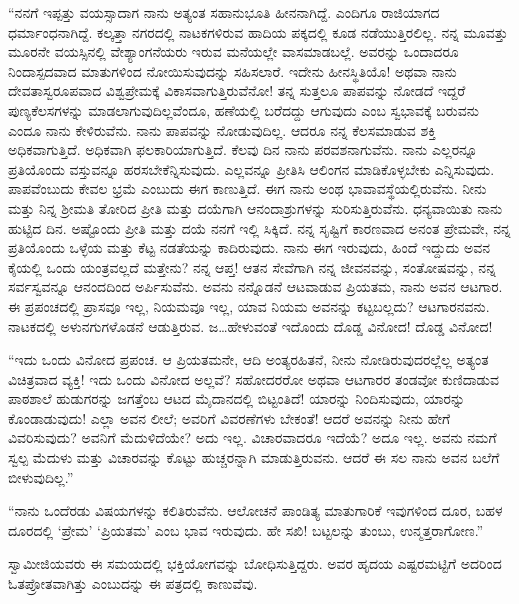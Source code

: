  “ನನಗೆ ಇಪ್ಪತ್ತು ವಯಸ್ಸಾದಾಗ ನಾನು ಅತ್ಯಂತ ಸಹಾನುಭೂತಿ ಹೀನನಾಗಿದ್ದೆ. ಎಂದಿಗೂ ರಾಜಿಯಾಗದ ಧರ್ಮಾಂಧನಾಗಿದ್ದೆ. ಕಲ್ಕತ್ತಾ ನಗರದಲ್ಲಿ ನಾಟಕಗಳಿರುವ ಹಾದಿಯ ಪಕ್ಕದಲ್ಲಿ ಕೂಡ ನಡೆಯುತ್ತಿರಲಿಲ್ಲ. ನನ್ನ ಮೂವತ್ತು ಮೂರನೇ ವಯಸ್ಸಿನಲ್ಲಿ ವೇಶ್ಯಾಂಗನೆಯರು ಇರುವ ಮನೆಯಲ್ಲೇ ವಾಸಮಾಡಬಲ್ಲೆ. ಅವರನ್ನು ಒಂದಾದರೂ ನಿಂದಾಸ್ಪದವಾದ ಮಾತುಗಳಿಂದ ನೋಯಿಸುವುದನ್ನು ಸಹಿಸಲಾರೆ. ಇದೇನು ಹೀನಸ್ಥಿತಿಯೊ! ಅಥವಾ ನಾನು ದೇವತಾಸ್ವರೂಪವಾದ ವಿಶ್ವಪ್ರೇಮಕ್ಕೆ ವಿಕಾಸವಾಗುತ್ತಿರುವೆನೋ! ತನ್ನ ಸುತ್ತಲೂ ಪಾಪವನ್ನು ನೋಡದೆ ಇದ್ದರೆ ಪುಣ್ಯಕೆಲಸಗಳನ್ನು ಮಾಡಲಾಗುವುದಿಲ್ಲವೆಂದೂ, ಹಣೆಯಲ್ಲಿ ಬರೆದದ್ದು ಆಗುವುದು ಎಂಬ ಸ್ವಭಾವಕ್ಕೆ ಬರುವನು ಎಂದೂ ನಾನು ಕೇಳಿರುವೆನು. ನಾನು ಪಾಪವನ್ನು ನೋಡುವುದಿಲ್ಲ. ಆದರೂ ನನ್ನ ಕೆಲಸಮಾಡುವ ಶಕ್ತಿ ಅಧಿಕವಾಗುತ್ತಿದೆ. ಅಧಿಕವಾಗಿ ಫಲಕಾರಿಯಾಗುತ್ತಿದೆ. ಕೆಲವು ದಿನ ನಾನು ಪರವಶನಾಗುವೆನು. ನಾನು ಎಲ್ಲರನ್ನೂ ಪ್ರತಿಯೊಂದು ವಸ್ತುವನ್ನೂ ಹರಸಬೇಕೆನ್ನಿಸುವುದು. ಎಲ್ಲವನ್ನೂ ಪ್ರೀತಿಸಿ ಆಲಿಂಗನ ಮಾಡಿಕೊಳ್ಳಬೇಕು ಎನ್ನಿಸುವುದು. ಪಾಪವೆಂಬುದು ಕೇವಲ ಭ್ರಮೆ ಎಂಬುದು ಈಗ ಕಾಣುತ್ತಿದೆ. ಈಗ ನಾನು ಅಂಥ ಭಾವಾವಸ್ಥೆಯಲ್ಲಿರುವೆನು. ನೀನು ಮತ್ತು ನಿನ್ನ ಶ‍್ರೀಮತಿ ತೋರಿದ ಪ್ರೀತಿ ಮತ್ತು ದಯೆಗಾಗಿ ಆನಂದಾಶ್ರುಗಳನ್ನು ಸುರಿಸುತ್ತಿರುವೆನು. ಧನ್ಯವಾಯಿತು ನಾನು ಹುಟ್ಟಿದ ದಿನ. ಅಷ್ಟೊಂದು ಪ್ರೀತಿ ಮತ್ತು ದಯೆ ನನಗೆ ಇಲ್ಲಿ ಸಿಕ್ಕಿದೆ. ನನ್ನ ಸೃಷ್ಟಿಗೆ ಕಾರಣವಾದ ಅನಂತ ಪ್ರೇಮವೇ, ನನ್ನ ಪ್ರತಿಯೊಂದು ಒಳ್ಳೆಯ ಮತ್ತು ಕೆಟ್ಟ ನಡತೆಯನ್ನು ಕಾದಿರುವುದು. ನಾನು ಈಗ ಇರುವುದು, ಹಿಂದೆ ಇದ್ದುದು ಅವನ ಕೈಯಲ್ಲಿ ಒಂದು ಯಂತ್ರವಲ್ಲದೆ ಮತ್ತೇನು? ನನ್ನ ಆಪ್ತ! ಆತನ ಸೇವೆಗಾಗಿ ನನ್ನ ಜೀವನವನ್ನು, ಸಂತೋಷವನ್ನು, ನನ್ನ ಸರ್ವಸ್ವವನ್ನೂ ಆನಂದದಿಂದ ಅರ್ಪಿಸುವೆನು. ಅವನು ನನ್ನೊಡನೆ ಆಟವಾಡುವ ಪ್ರಿಯತಮ, ನಾನು ಅವನ ಆಟಗಾರ. ಈ ಪ್ರಪಂಚದಲ್ಲಿ ಪ್ರಾಸವೂ ಇಲ್ಲ, ನಿಯಮವೂ ಇಲ್ಲ, ಯಾವ ನಿಯಮ ಅವನನ್ನು ಕಟ್ಟಬಲ್ಲದು? ಆಟಗಾರನವನು. ನಾಟಕದಲ್ಲಿ ಅಳುನಗುಗಳೊಡನೆ ಆಡುತ್ತಿರುವ. ಜ…ಹೇಳುವಂತೆ ಇದೊಂದು ದೊಡ್ಡ ವಿನೋದ! ದೊಡ್ಡ ವಿನೋದ! 

 “ಇದು ಒಂದು ವಿನೋದ ಪ್ರಪಂಚ. ಆ ಪ್ರಿಯತಮನೇ, ಆದಿ ಅಂತ್ಯರಹಿತನೆ, ನೀನು ನೋಡಿರುವುದರಲ್ಲೆಲ್ಲ ಅತ್ಯಂತ ವಿಚಿತ್ರವಾದ ವ್ಯಕ್ತಿ! ಇದು ಒಂದು ವಿನೋದ ಅಲ್ಲವೆ? ಸಹೋದರರೋ ಅಥವಾ ಆಟಗಾರರ ತಂಡವೋ ಕುಣಿದಾಡುವ ಪಾಠಶಾಲೆ ಹುಡುಗರನ್ನು ಜಗತ್ತೆಂಬ ಆಟದ ಮೈದಾನದಲ್ಲಿ ಬಿಟ್ಟಂತಿದೆ! ಯಾರನ್ನು ನಿಂದಿಸುವುದು, ಯಾರನ್ನು ಕೊಂಡಾಡುವುದು! ಎಲ್ಲಾ ಅವನ ಲೀಲೆ; ಅವರಿಗೆ ವಿವರಣೆಗಳು ಬೇಕಂತೆ! ಆದರೆ ಅವನನ್ನು ನೀನು ಹೇಗೆ ವಿವರಿಸುವುದು? ಅವನಿಗೆ ಮೆದುಳಿದೆಯೇ? ಅದು ಇಲ್ಲ. ವಿಚಾರವಾದರೂ ಇದೆಯೆ? ಅದೂ ಇಲ್ಲ. ಅವನು ನಮಗೆ ಸ್ವಲ್ಪ ಮೆದುಳು ಮತ್ತು ವಿಚಾರವನ್ನು ಕೊಟ್ಟು ಹುಚ್ಚರನ್ನಾಗಿ ಮಾಡುತ್ತಿರುವನು. ಆದರೆ ಈ ಸಲ ನಾನು ಅವನ ಬಲೆಗೆ ಬೀಳುವುದಿಲ್ಲ.” 

 “ನಾನು ಒಂದೆರಡು ವಿಷಯಗಳನ್ನು ಕಲಿತಿರುವೆನು. ಆಲೋಚನೆ ಪಾಂಡಿತ್ಯ ಮಾತುಗಾರಿಕೆ ಇವುಗಳಿಂದ ದೂರ, ಬಹಳ ದೂರದಲ್ಲಿ ‘ಪ್ರೇಮ’ ‘ಪ್ರಿಯತಮ’ ಎಂಬ ಭಾವ ಇರುವುದು. ಹೇ ಸಖಿ! ಬಟ್ಟಲನ್ನು ತುಂಬು, ಉನ್ಮತ್ತರಾಗೋಣ.” 

 ಸ್ವಾಮೀಜಿಯವರು ಈ ಸಮಯದಲ್ಲಿ ಭಕ್ತಿಯೋಗವನ್ನು ಬೋಧಿಸುತ್ತಿದ್ದರು. ಅವರ ಹೃದಯ ಎಷ್ಟರಮಟ್ಟಿಗೆ ಅದರಿಂದ ಓತಪ್ರೋತವಾಗಿತ್ತು ಎಂಬುದನ್ನು ಈ ಪತ್ರದಲ್ಲಿ ಕಾಣುವೆವು. 

